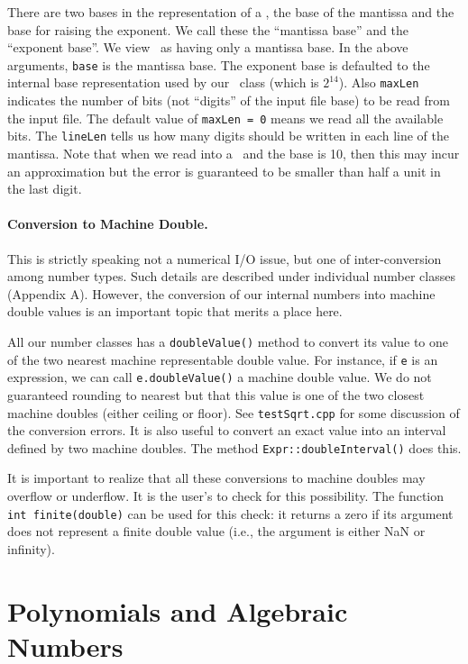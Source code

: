 \documentclass[12pt]{article}
\begin{document}
There are two bases in the representation of a \BF, the base
of the mantissa and the base for raising the exponent.
We call these the ``mantissa base'' and the ``exponent base''.
We view \Int\ as having only a mantissa base.
In the above arguments, \texttt{base} is the mantissa base.
The exponent base is defaulted to the internal base representation
used by our \BF\ class (which is $2^{14}$).
Also {\tt maxLen} indicates the number of bits (not ``digits'' of the
input file base) to be read from the input file.  
The default value of {\tt maxLen = 0} means we read all the
available bits.  The {\tt lineLen} tells us how many digits should
be written in each line of the mantissa.
Note that when we read into a \BF\, and the base is 10, then
this may incur an approximation but the error is guaranteed
to be smaller than half a unit in the last digit.

\paragraph{Conversion to Machine Double.}
This is strictly speaking not a numerical I/O issue,
but one of inter-conversion among number types.
Such details are described under individual
number classes (Appendix A).  However, the conversion of our internal
numbers into machine double values is an important topic
that merits a place here.

All our number classes has a \texttt{doubleValue()} method
to convert its value to one of the two 
nearest machine representable double value.  
For instance, if \texttt{e} is an expression,
we can call \texttt{e.doubleValue()} a machine double value.
We do not guaranteed rounding to nearest but that
this value is one of the two closest machine doubles
(either ceiling or floor).  See \progsdir\texttt{testSqrt.cpp}
for some discussion of the conversion errors.
It is also useful to convert an exact value into
an interval defined by two machine doubles.
The method \texttt{Expr::doubleInterval()} does this.

It is important to realize that all these conversions
to machine doubles may overflow or underflow.
It is the user's to check for this possibility.
The function \texttt{int finite(double)} can be used for
this check: it returns a zero
if its argument does not represent a finite
double value (i.e., the argument is either NaN or infinity).

\section{Polynomials and Algebraic Numbers}
	\label{sec-algebraic}
\end{document}
